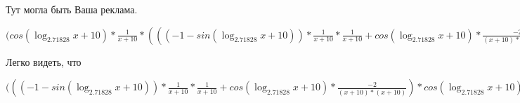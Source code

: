 \documentclass[12pt,a4paper,fleqn]{article}
\theoremstyle{definition}
\begin{document}
Тут могла быть Ваша реклама.

$(cos(\log_{ 2.71828 }{ x  +  10 }) * \frac{ 1 }{ x  +  10 }
 * ((( -1  - sin(\log_{ 2.71828 }{ x  +  10 })) * \frac{ 1 }{ x  +  10 }
 * \frac{ 1 }{ x  +  10 }
 + cos(\log_{ 2.71828 }{ x  +  10 }) * \frac{ -2 }{( x  +  10 ) * ( x  +  10 )}
) * { 3 }^{sin(\log_{ 2.71828 }{ x  +  10 })} + cos(\log_{ 2.71828 }{ x  +  10 }) * \frac{ 1 }{ x  +  10 }
 * cos(\log_{ 2.71828 }{ x  +  10 }) * \frac{ 1 }{ x  +  10 }
 * { 3 }^{sin(\log_{ 2.71828 }{ x  +  10 })}) = cos(\log_{ 2.71828 }{ x  +  10 }) * \frac{ 1 }{ x  +  10 }
 * ((( -1  - sin(\log_{ 2.71828 }{ x  +  10 })) * \frac{ 1 }{ x  +  10 }
 * \frac{ 1 }{ x  +  10 }
 + cos(\log_{ 2.71828 }{ x  +  10 }) * \frac{ -2 }{( x  +  10 ) * ( x  +  10 )}
) * { 3 }^{sin(\log_{ 2.71828 }{ x  +  10 })} + cos(\log_{ 2.71828 }{ x  +  10 }) * \frac{ 1 }{ x  +  10 }
 * cos(\log_{ 2.71828 }{ x  +  10 }) * \frac{ 1 }{ x  +  10 }
 * { 3 }^{sin(\log_{ 2.71828 }{ x  +  10 })})$

Легко видеть, что

$((( -1  - sin(\log_{ 2.71828 }{ x  +  10 })) * \frac{ 1 }{ x  +  10 }
 * \frac{ 1 }{ x  +  10 }
 + cos(\log_{ 2.71828 }{ x  +  10 }) * \frac{ -2 }{( x  +  10 ) * ( x  +  10 )}
) * cos(\log_{ 2.71828 }{ x  +  10 }) * \frac{ 1 }{ x  +  10 }
 * { 3 }^{sin(\log_{ 2.71828 }{ x  +  10 })} + cos(\log_{ 2.71828 }{ x  +  10 }) * \frac{ 1 }{ x  +  10 }
 * ((( -1  - sin(\log_{ 2.71828 }{ x  +  10 })) * \frac{ 1 }{ x  +  10 }
 * \frac{ 1 }{ x  +  10 }
 + cos(\log_{ 2.71828 }{ x  +  10 }) * \frac{ -2 }{( x  +  10 ) * ( x  +  10 )}
) * { 3 }^{sin(\log_{ 2.71828 }{ x  +  10 })} + cos(\log_{ 2.71828 }{ x  +  10 }) * \frac{ 1 }{ x  +  10 }
 * cos(\log_{ 2.71828 }{ x  +  10 }) * \frac{ 1 }{ x  +  10 }
 * { 3 }^{sin(\log_{ 2.71828 }{ x  +  10 })}) = (( -1  - sin(\log_{ 2.71828 }{ x  +  10 })) * \frac{ 1 }{ x  +  10 }
 * \frac{ 1 }{ x  +  10 }
 + cos(\log_{ 2.71828 }{ x  +  10 }) * \frac{ -2 }{( x  +  10 ) * ( x  +  10 )}
) * cos(\log_{ 2.71828 }{ x  +  10 }) * \frac{ 1 }{ x  +  10 }
 * { 3 }^{sin(\log_{ 2.71828 }{ x  +  10 })} + cos(\log_{ 2.71828 }{ x  +  10 }) * \frac{ 1 }{ x  +  10 }
 * ((( -1  - sin(\log_{ 2.71828 }{ x  +  10 })) * \frac{ 1 }{ x  +  10 }
 * \frac{ 1 }{ x  +  10 }
 + cos(\log_{ 2.71828 }{ x  +  10 }) * \frac{ -2 }{( x  +  10 ) * ( x  +  10 )}
) * { 3 }^{sin(\log_{ 2.71828 }{ x  +  10 })} + cos(\log_{ 2.71828 }{ x  +  10 }) * \frac{ 1 }{ x  +  10 }
 * cos(\log_{ 2.71828 }{ x  +  10 }) * \frac{ 1 }{ x  +  10 }
 * { 3 }^{sin(\log_{ 2.71828 }{ x  +  10 })})$
\end{document}
